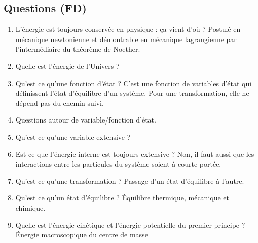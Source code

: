 \subsection*{Questions (FD)}

\begin{enumerate}
\item L'énergie est toujours conservée en physique : ça vient d'où ? Postulé en mécanique newtonienne et démontrable en mécanique lagrangienne par l'intermédiaire du théorème de Noether.
\item Quelle est l'énergie de l'Univers ?
\item Qu'est ce qu'une fonction d'état ? C'est une fonction de variables d'état qui définissent l'état d'équilibre d'un système. Pour une transformation, elle ne dépend pas du chemin suivi.
\item Questions autour de variable/fonction d'état.
\item Qu'est ce qu'une variable extensive ?
\item Est ce que l'énergie interne est toujours extensive ? Non, il faut aussi que les interactions entre les particules du système soient à courte portée.
\item Qu'est ce qu'une transformation ? Passage d'un état d'équilibre à l'autre.
\item Qu'est ce qu'un état d'équilibre ? Équilibre thermique, mécanique et chimique.
\item Quelle est l'énergie cinétique et l'énergie potentielle du premier principe ? Énergie macroscopique du centre de masse
\end{enumerate}

\newpage